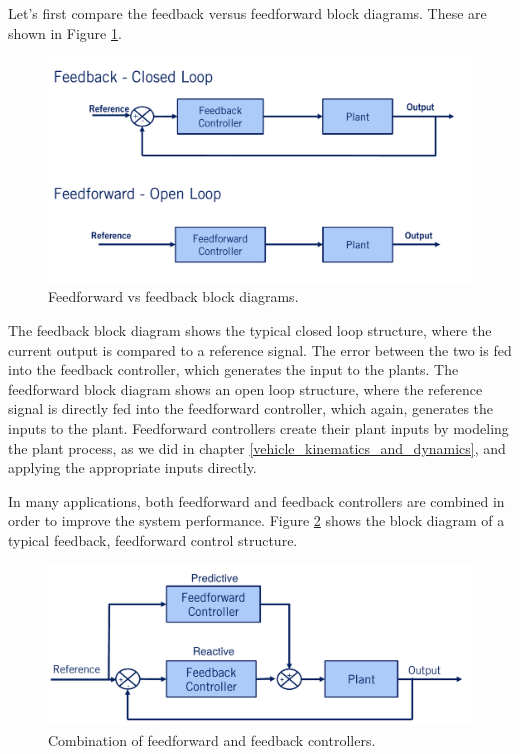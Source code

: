 Let's first  compare the feedback
versus feedforward block diagrams. These are shown in Figure \ref{feedback_vs_feedforward_control}. 
\begin{figure}[!htb]
\begin{center}
\includegraphics[scale=0.380]{img/longitudinal_control/feedback_vs_feedforward_control.jpeg}
\end{center}
\caption{Feedforward vs feedback block diagrams.}
\label{feedback_vs_feedforward_control}
\end{figure}
The feedback block diagram shows the typical closed loop structure, where the current output is
compared to a reference signal. The error between the two is fed into the feedback controller, which generates the input to the plants. The feedforward block diagram shows an open loop structure, where the reference signal is directly
fed into the feedforward controller, which again, generates the inputs to the plant. Feedforward controllers create their plant inputs by modeling the plant process, as we did in chapter \ref{vehicle_kinematics_and_dynamics}, and applying the appropriate inputs directly. 


In many applications, both feedforward and feedback controllers are combined in order to improve the system performance. 
Figure \ref{feedback_and_feedforward_control_architecture} shows the block diagram of a typical feedback, feedforward control structure. 
\begin{figure}[!htb]
\begin{center}
\includegraphics[scale=0.380]{img/longitudinal_control/feedback_and_feedforward_control_architecture.jpeg}
\end{center}
\caption{Combination of feedforward and feedback controllers.}
\label{feedback_and_feedforward_control_architecture}
\end{figure}


